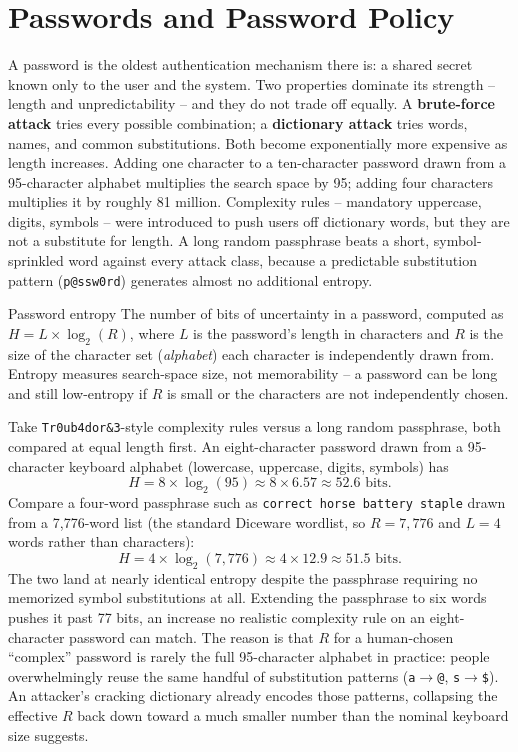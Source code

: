\section{Passwords and Password Policy}

A password is the oldest authentication mechanism there is: a shared secret known only to the user
and the system. Two properties dominate its strength -- length and unpredictability -- and they do
not trade off equally. A \textbf{brute-force attack} tries every possible combination; a
\textbf{dictionary attack} tries words, names, and common substitutions. Both become exponentially
more expensive as length increases. Adding one character to a ten-character password drawn from a
95-character alphabet multiplies the search space by 95; adding four characters multiplies it by
roughly 81 million. Complexity rules -- mandatory uppercase, digits, symbols -- were introduced to
push users off dictionary words, but they are not a substitute for length. A long random
passphrase beats a short, symbol-sprinkled word against every attack class, because a predictable
substitution pattern (\texttt{p@ssw0rd}) generates almost no additional entropy.

\begin{definition}{Password entropy}
The number of bits of uncertainty in a password, computed as $H = L \times \log_2(R)$, where $L$ is
the password's length in characters and $R$ is the size of the character set (\emph{alphabet}) each
character is independently drawn from. Entropy measures search-space size, not memorability -- a
password can be long and still low-entropy if $R$ is small or the characters are not independently
chosen.
\end{definition}

\begin{example}
Take \texttt{Tr0ub4dor\&3}-style complexity rules versus a long random passphrase, both compared at
equal length first. An eight-character password drawn from a 95-character keyboard alphabet
(lowercase, uppercase, digits, symbols) has
\[
H = 8 \times \log_2(95) \approx 8 \times 6.57 \approx 52.6 \text{ bits.}
\]
Compare a four-word passphrase such as \texttt{correct horse battery staple} drawn from a
7{,}776-word list (the standard Diceware wordlist, so $R = 7{,}776$ and $L = 4$ words rather than
characters):
\[
H = 4 \times \log_2(7{,}776) \approx 4 \times 12.9 \approx 51.5 \text{ bits.}
\]
The two land at nearly identical entropy despite the passphrase requiring no memorized symbol
substitutions at all. Extending the passphrase to six words pushes it past 77 bits, an increase no
realistic complexity rule on an eight-character password can match. The reason is that $R$ for a
human-chosen ``complex'' password is rarely the full 95-character alphabet in practice: people
overwhelmingly reuse the same handful of substitution patterns (\texttt{a}$\to$\texttt{@},
\texttt{s}$\to$\texttt{\$}). An attacker's cracking dictionary already encodes those patterns,
collapsing the effective $R$ back down toward a much smaller number than the nominal keyboard size
suggests.
\end{example}

